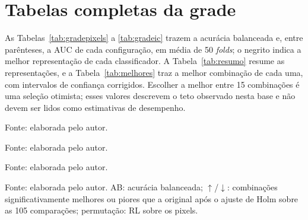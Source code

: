 \chapter{Tabelas completas da grade}
\label{ap:tabelas}

As Tabelas~\ref{tab:gradepixels} a \ref{tab:gradeic} trazem a acurácia
balanceada e, entre parênteses, a AUC de cada configuração, em média de 50
\emph{folds}; o negrito indica a melhor representação de cada classificador.
A Tabela~\ref{tab:resumo} resume as representações, e a
Tabela~\ref{tab:melhores} traz a melhor combinação de cada uma, com
intervalos de confiança corrigidos. Escolher a melhor entre 15 combinações é
uma seleção otimista; esses valores descrevem o teto observado nesta base e
não devem ser lidos como estimativas de desempenho.

\begin{table}[htbp]
  \centering
  \caption{Grade com o conjunto de pixels}
  \label{tab:gradepixels}
  \footnotesize
  \resizebox{\textwidth}{!}{}
  \par\medskip
  \footnotesize Fonte: elaborada pelo autor.
\end{table}

\begin{table}[htbp]
  \centering
  \caption{Grade com o conjunto de textura}
  \label{tab:gradetextura}
  \footnotesize
  \resizebox{\textwidth}{!}{}
  \par\medskip
  \footnotesize Fonte: elaborada pelo autor.
\end{table}

\begin{table}[htbp]
  \centering
  \caption{Grade com o conjunto padrão da IC}
  \label{tab:gradeic}
  \footnotesize
  \resizebox{\textwidth}{!}{}
  \par\medskip
  \footnotesize Fonte: elaborada pelo autor.
\end{table}

\begin{table}[htbp]
  \centering
  \caption{Resumo por representação: médias da grade, postos de Friedman,
  comparações com a original e teste de permutação}
  \label{tab:resumo}
  \footnotesize
  \resizebox{\textwidth}{!}{}
  \par\medskip
  \footnotesize Fonte: elaborada pelo autor. AB: acurácia balanceada;
  $\uparrow$/$\downarrow$: combinações significativamente melhores ou piores
  que a original após o ajuste de Holm sobre as 105 comparações; permutação:
  RL sobre os pixels.
\end{table}

